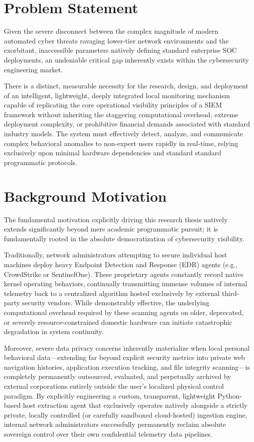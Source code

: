 \section{Problem Statement}
Given the severe disconnect between the complex magnitude of modern automated cyber threats ravaging lower-tier network environments and the exorbitant, inaccessible parameters natively defining standard enterprise SOC deployments, an undeniable critical gap inherently exists within the cybersecurity engineering market. 

There is a distinct, measurable necessity for the research, design, and deployment of an intelligent, lightweight, deeply integrated local monitoring mechanism capable of replicating the core operational visibility principles of a SIEM framework without inheriting the staggering computational overhead, extreme deployment complexity, or prohibitive financial demands associated with standard industry models. The system must effectively detect, analyze, and communicate complex behavioral anomalies to non-expert users rapidly in real-time, relying exclusively upon minimal hardware dependencies and standard standard programmatic protocols.

\section{Background Motivation}
The fundamental motivation explicitly driving this research thesis natively extends significantly beyond mere academic programmatic pursuit; it is fundamentally rooted in the absolute democratization of cybersecurity visibility. 

Traditionally, network administrators attempting to secure individual host machines deploy heavy Endpoint Detection and Response (EDR) agents (e.g., CrowdStrike or SentinelOne). These proprietary agents constantly record native kernel operating behaviors, continually transmitting immense volumes of internal telemetry back to a centralized algorithm hosted exclusively by external third-party security vendors. While demonstrably effective, the underlying computational overhead required by these scanning agents on older, deprecated, or severely resource-constrained domestic hardware can initiate catastrophic degradation in system continuity. 

Moreover, severe data privacy concerns inherently materialize when local personal behavioral data—extending far beyond explicit security metrics into private web navigation histories, application execution tracking, and file integrity scanning—is completely permanently outsourced, evaluated, and perpetually archived by external corporations entirely outside the user's localized physical control paradigm. By explicitly engineering a custom, transparent, lightweight Python-based host extraction agent that exclusively operates natively alongside a strictly private, locally controlled (or carefully sandboxed cloud-hosted) ingestion engine, internal network administrators successfully permanently reclaim absolute sovereign control over their own confidential telemetry data pipelines.

